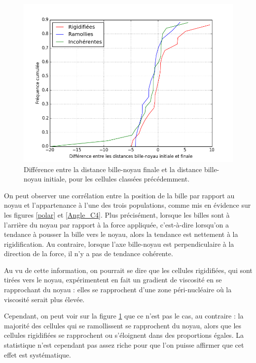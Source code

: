 \begin{figure}[p]
\includegraphics[scale=0.5]{Figures/Evolution_DBN.png}
\caption{Différence entre la distance bille-noyau finale et la distance bille-noyau initiale, pour les cellules classées précédemment. \label{DBN}}
\end{figure}


On peut observer une corrélation entre la position de la bille par rapport au noyau et l'appartenance à l'une des trois populations, comme mis en évidence sur les figures \ref{polar} et \ref{Angle_C4}. 
Plus précisément, lorsque les billes sont \og à l'arrière du noyau \fg par rapport à la force appliquée, c'est-à-dire lorsqu'on a tendance à pousser la bille vers le noyau, alors la tendance est nettement à la rigidification. Au contraire, lorsque l'axe bille-noyau est perpendiculaire à la direction de la force, il n'y a pas de tendance cohérente. 

Au vu de cette information, on pourrait se dire que les cellules rigidifiées, qui sont tirées vers le noyau, expérimentent en fait un gradient de viscosité en se rapprochant du noyau : elles se rapprochent d'une zone péri-nucléaire où la viscosité serait plus élevée. 

Cependant, on peut voir sur la figure \ref{DBN} que ce n'est pas le cas, au contraire : la majorité des cellules qui se ramollissent se rapprochent du noyau, alors que les cellules rigidifiées se rapprochent ou s'éloignent dans des proportions égales. La statistique n'est cependant pas assez riche pour que l'on puisse affirmer que cet effet est systématique.

